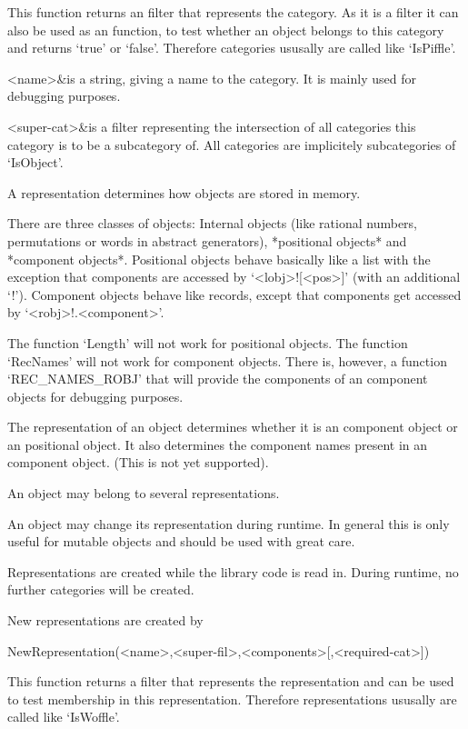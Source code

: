 This function returns an filter that represents the category. As it is a filter
it can also be used as an function, to test whether an object belongs to this
category and returns `true' or `false'. Therefore categories ususally are
called like `IsPiffle'.

\beginitems
<name>&is a string, giving a name to the category. It is mainly used for
debugging purposes.

<super-cat>&is a filter representing the intersection of all categories this
category is to be a subcategory of. All categories are implicitely
subcategories of `IsObject'.
\enditems



A representation determines how objects are stored in memory.

There are three classes of objects: Internal objects (like rational numbers,
permutations or words in abstract generators), *positional objects* and
*component objects*. Positional objects behave basically like a list with
the exception that components are accessed by `<lobj>\/![<pos>]'
(with an additional `!'). Component objects behave
like records, except that components get accessed by `<robj>\/!.<component>'.

\danger
The function `Length' will not work for positional objects. The function
`RecNames' will not work for component objects. There is, however, a
function `REC_NAMES_ROBJ' that will provide the components of an component
objects for debugging purposes.

The representation of an object determines whether it is an component
object or an positional object. It also determines the component names
present in an component object.
(This is not yet supported).

An object may belong to several representations.

\danger
An object may change its representation during runtime. In general this is
only useful for mutable objects and should be used with great care.

\danger
Representations are created while the library code is read in. During runtime,
no further categories will be created.

New representations are created by 

\>NewRepresentation(<name>,<super-fil>,<components>[,<required-cat>])

This function returns a filter that represents the representation and can be
used to test membership in this representation.
Therefore representations ususally are called like `IsWoffle'.


